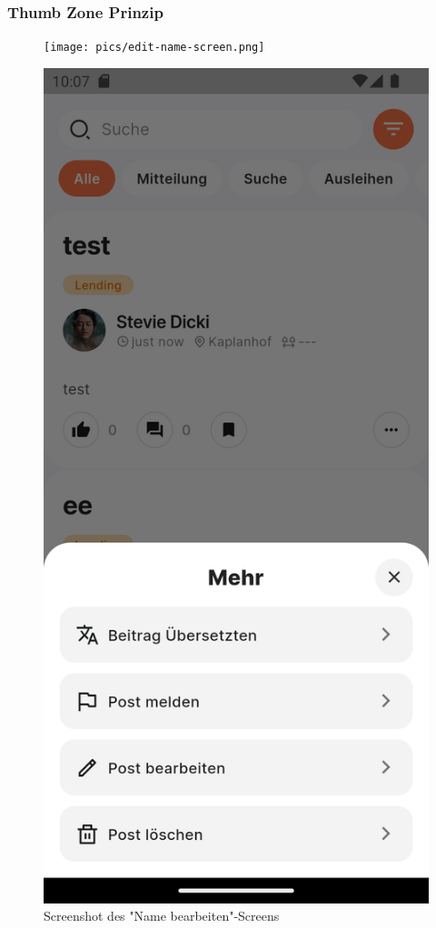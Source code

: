 \subsubsection{Thumb Zone Prinzip}
\begin{figure}[h]
  \centering
  \begin{minipage}[b]{0.3\textwidth}
    \texttt{[image: pics/edit-name-screen.png]}
    \caption{Screenshot des "Name bearbeiten"-Screens}
    \label{fig:edit-name-screen}
  \end{minipage}
  \hfill
  \begin{minipage}[b]{0.3\textwidth}
    \includegraphics[width=\textwidth]{pics/post-more-menu.png}

\end{minipage}
\end{figure}
